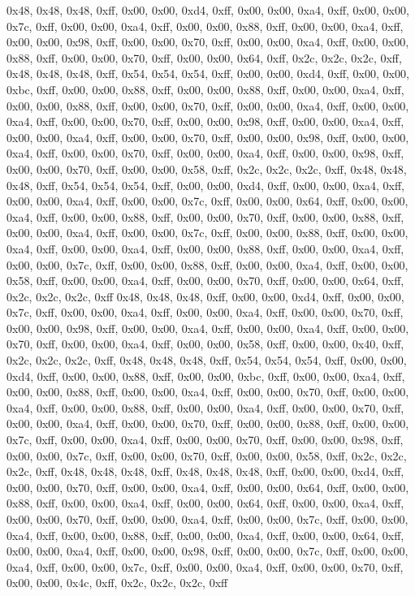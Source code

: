 0x48, 0x48, 0x48, 0xff, 0x00, 0x00, 0xd4, 0xff, 0x00, 0x00, 0xa4, 0xff, 0x00, 0x00, 0x7c, 0xff, 0x00, 0x00, 0xa4, 0xff, 0x00, 0x00, 0x88, 0xff, 0x00, 0x00, 0xa4, 0xff, 0x00, 0x00, 0x98, 0xff, 0x00, 0x00, 0x70, 0xff, 0x00, 0x00, 0xa4, 0xff, 0x00, 0x00, 0x88, 0xff, 0x00, 0x00, 0x70, 0xff, 0x00, 0x00, 0x64, 0xff, 0x2c, 0x2c, 0x2c, 0xff, 0x48, 0x48, 0x48, 0xff, 0x54, 0x54, 0x54, 0xff, 0x00, 0x00, 0xd4, 0xff, 0x00, 0x00, 0xbc, 0xff, 0x00, 0x00, 0x88, 0xff, 0x00, 0x00, 0x88, 0xff, 0x00, 0x00, 0xa4, 0xff, 0x00, 0x00, 0x88, 0xff, 0x00, 0x00, 0x70, 0xff, 0x00, 0x00, 0xa4, 0xff, 0x00, 0x00, 0xa4, 0xff, 0x00, 0x00, 0x70, 0xff, 0x00, 0x00, 0x98, 0xff, 0x00, 0x00, 0xa4, 0xff, 0x00, 0x00, 0xa4, 0xff, 0x00, 0x00, 0x70, 0xff, 0x00, 0x00, 0x98, 0xff, 0x00, 0x00, 0xa4, 0xff, 0x00, 0x00, 0x70, 0xff, 0x00, 0x00, 0xa4, 0xff, 0x00, 0x00, 0x98, 0xff, 0x00, 0x00, 0x70, 0xff, 0x00, 0x00, 0x58, 0xff, 0x2c, 0x2c, 0x2c, 0xff, 0x48, 0x48, 0x48, 0xff, 0x54, 0x54, 0x54, 0xff, 0x00, 0x00, 0xd4, 0xff, 0x00, 0x00, 0xa4, 0xff, 0x00, 0x00, 0xa4, 0xff, 0x00, 0x00, 0x7c, 0xff, 0x00, 0x00, 0x64, 0xff, 0x00, 0x00, 0xa4, 0xff, 0x00, 0x00, 0x88, 0xff, 0x00, 0x00, 0x70, 0xff, 0x00, 0x00, 0x88, 0xff, 0x00, 0x00, 0xa4, 0xff, 0x00, 0x00, 0x7c, 0xff, 0x00, 0x00, 0x88, 0xff, 0x00, 0x00, 0xa4, 0xff, 0x00, 0x00, 0xa4, 0xff, 0x00, 0x00, 0x88, 0xff, 0x00, 0x00, 0xa4, 0xff, 0x00, 0x00, 0x7c, 0xff, 0x00, 0x00, 0x88, 0xff, 0x00, 0x00, 0xa4, 0xff, 0x00, 0x00, 0x58, 0xff, 0x00, 0x00, 0xa4, 0xff, 0x00, 0x00, 0x70, 0xff, 0x00, 0x00, 0x64, 0xff, 0x2c, 0x2c, 0x2c, 0xff
0x48, 0x48, 0x48, 0xff, 0x00, 0x00, 0xd4, 0xff, 0x00, 0x00, 0x7c, 0xff, 0x00, 0x00, 0xa4, 0xff, 0x00, 0x00, 0xa4, 0xff, 0x00, 0x00, 0x70, 0xff, 0x00, 0x00, 0x98, 0xff, 0x00, 0x00, 0xa4, 0xff, 0x00, 0x00, 0xa4, 0xff, 0x00, 0x00, 0x70, 0xff, 0x00, 0x00, 0xa4, 0xff, 0x00, 0x00, 0x58, 0xff, 0x00, 0x00, 0x40, 0xff, 0x2c, 0x2c, 0x2c, 0xff, 0x48, 0x48, 0x48, 0xff, 0x54, 0x54, 0x54, 0xff, 0x00, 0x00, 0xd4, 0xff, 0x00, 0x00, 0x88, 0xff, 0x00, 0x00, 0xbc, 0xff, 0x00, 0x00, 0xa4, 0xff, 0x00, 0x00, 0x88, 0xff, 0x00, 0x00, 0xa4, 0xff, 0x00, 0x00, 0x70, 0xff, 0x00, 0x00, 0xa4, 0xff, 0x00, 0x00, 0x88, 0xff, 0x00, 0x00, 0xa4, 0xff, 0x00, 0x00, 0x70, 0xff, 0x00, 0x00, 0xa4, 0xff, 0x00, 0x00, 0x70, 0xff, 0x00, 0x00, 0x88, 0xff, 0x00, 0x00, 0x7c, 0xff, 0x00, 0x00, 0xa4, 0xff, 0x00, 0x00, 0x70, 0xff, 0x00, 0x00, 0x98, 0xff, 0x00, 0x00, 0x7c, 0xff, 0x00, 0x00, 0x70, 0xff, 0x00, 0x00, 0x58, 0xff, 0x2c, 0x2c, 0x2c, 0xff, 0x48, 0x48, 0x48, 0xff, 0x48, 0x48, 0x48, 0xff, 0x00, 0x00, 0xd4, 0xff, 0x00, 0x00, 0x70, 0xff, 0x00, 0x00, 0xa4, 0xff, 0x00, 0x00, 0x64, 0xff, 0x00, 0x00, 0x88, 0xff, 0x00, 0x00, 0xa4, 0xff, 0x00, 0x00, 0x64, 0xff, 0x00, 0x00, 0xa4, 0xff, 0x00, 0x00, 0x70, 0xff, 0x00, 0x00, 0xa4, 0xff, 0x00, 0x00, 0x7c, 0xff, 0x00, 0x00, 0xa4, 0xff, 0x00, 0x00, 0x88, 0xff, 0x00, 0x00, 0xa4, 0xff, 0x00, 0x00, 0x64, 0xff, 0x00, 0x00, 0xa4, 0xff, 0x00, 0x00, 0x98, 0xff, 0x00, 0x00, 0x7c, 0xff, 0x00, 0x00, 0xa4, 0xff, 0x00, 0x00, 0x7c, 0xff, 0x00, 0x00, 0xa4, 0xff, 0x00, 0x00, 0x70, 0xff, 0x00, 0x00, 0x4c, 0xff, 0x2c, 0x2c, 0x2c, 0xff
